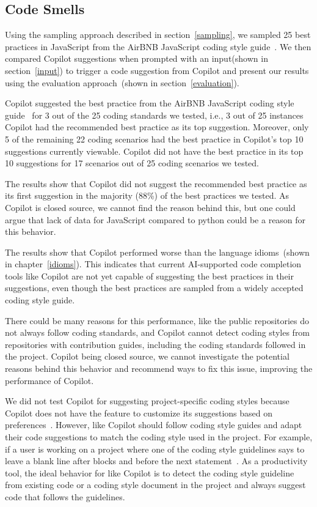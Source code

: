\subsection{Code Smells}
\label{smells:results}
Using the sampling approach described in section~\ref{sampling}, we sampled 25 best practices in JavaScript from the AirBNB JavaScript coding style guide~\cite{airbnb_code}. 
We then compared Copilot suggestions when prompted with an input(shown in section~\ref{input}) to trigger a code suggestion from Copilot and present our results using the evaluation approach~(shown in section~\ref{evaluation}).

Copilot suggested the best practice from the AirBNB JavaScript coding style guide~\cite{airbnb_code} for 3 out of the 25 coding standards we tested, i.e., 3 out of 25 instances Copilot had the recommended best practice as its top suggestion.
Moreover, only 5 of the remaining 22 coding scenarios had the best practice in Copilot's top 10 suggestions currently viewable. 
Copilot did not have the best practice in its top 10 suggestions for 17 scenarios out of 25 coding scenarios we tested.

The results show that Copilot did not suggest the recommended best practice as its first suggestion in the majority (88\%) of the best practices we tested.
As Copilot is closed source, we cannot find the reason behind this, but one could argue that lack of data for JavaScript compared to python could be a reason for this behavior. 

The results show that Copilot performed worse than the language idioms~(shown in chapter~\ref{idioms}). This indicates that current AI-supported
code completion tools like Copilot are not yet capable of suggesting the best practices in their suggestions, even though the best practices are sampled from a widely accepted coding style guide.

There could be many reasons for this performance, like the public repositories do not always follow coding standards, and Copilot cannot detect coding styles from repositories with contribution guides, including the coding standards followed in the project. 
Copilot being closed source, we cannot investigate the potential reasons behind this behavior and recommend ways to fix this issue, improving the performance of Copilot.

We did not test Copilot for suggesting project-specific coding styles because Copilot does not have the feature to customize its suggestions based on preferences~\cite{Copilot-web}.
However, \cct{} like Copilot should follow coding style guides and adapt their code suggestions to match the coding style used in the project. 
For example, if a user is working on a project where one of the coding style guidelines says to leave a blank line after blocks and before the next statement~\cite{airbnb_code}. As a productivity tool, the ideal behavior for \cct{} like Copilot is to detect the coding style guideline from existing code or a coding style document in the project and always suggest code that follows the guidelines.

